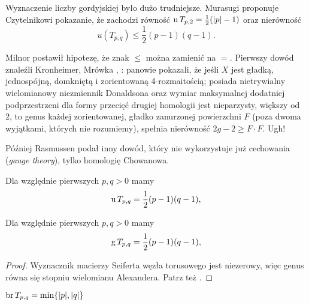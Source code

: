 Wyznaczenie liczby gordyjskiej było dużo trudniejsze.
Murasugi \cite[s. 150]{murasugi1996} proponuje Czytelnikowi pokazanie, że zachodzi równość $\operatorname{u} T_{p, 2} = \frac 12 (|p| - 1)$ oraz nierówność
\begin{equation}
    u(T_{p, q}) \le \frac 12 (p-1)(q-1).
\end{equation}

Milnor \cite[uwaga 10.9]{milnor1968} postawił hipotezę, że znak $\le$ można zamienić na $=$.
%
Pierwszy dowód znaleźli Kronheimer, Mrówka \cite{kronheimer1993}, \cite{kronheimer1995}: panowie pokazali, że jeśli $X$ jest gładką, jednospójną, domkniętą i zorientowaną 4-rozmaitością; posiada nietrywialny wielomianowy niezmiennik Donaldsona oraz wymiar maksymalnej dodatniej podprzestrzeni dla formy przecięć drugiej homologii jest nieparzysty, większy od 2, to genus każdej zorientowanej, gładko zanurzonej powierzchni $F$ (poza dwoma wyjątkami, których nie rozumiemy), spełnia nierówność $2g - 2 \ge F \cdot F$.
Ugh!

Później Rasmussen \cite{rasmussen2010} podał inny dowód, który nie wykorzystuje już cechowania (\emph{gauge theory}), tylko homologię Chowanowa.
%

\begin{proposition}
%
\label{prp:torus_unknotting_number}%
    Dla względnie pierwszych $p, q > 0$ mamy
    \begin{equation}
        \operatorname{u} T_{p, q} = \frac 12 (p - 1)(q - 1),
    \end{equation}
\end{proposition}

\begin{proposition}
    Dla względnie pierwszych $p, q > 0$ mamy
    \begin{equation}
        \operatorname{g} T_{p, q} = \frac 12 (p - 1)(q - 1),
    \end{equation}
\end{proposition}

\begin{proof}
    Wyznacznik macierzy Seiferta węzła torusowego jest niezerowy, więc genus równa się stopniu wielomianu Alexandera.
    Patrz też \cite[s. 149]{murasugi1996}.
\end{proof}

\begin{proposition}
%
    $\operatorname{br} T_{p, q} = \min \{|p|, |q|\}$
\end{proposition}

